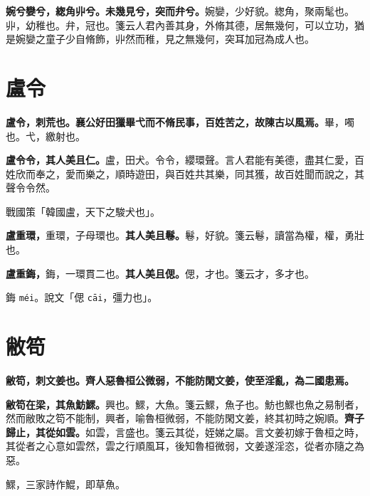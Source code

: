 \textbf{婉兮孌兮，緫角丱兮。未幾見兮，突而弁兮。}{\footnotesize 婉孌，少好貌。緫角，聚兩髦也。丱，幼稚也。弁，冠也。箋云人君內善其身，外脩其德，居無幾何，可以立功，猶是婉孌之童子少自脩飾，丱然而稚，見之無幾何，突耳加冠為成人也。}

\section{盧令}


\textbf{盧令，刺荒也。襄公好田獵畢弋而不脩民事，百姓苦之，故陳古以風焉。}{\footnotesize 畢，噣也。弋，繳射也。}

\textbf{盧令令，其人美且仁。}{\footnotesize 盧，田犬。令令，纓環聲。言人君能有美德，盡其仁愛，百姓欣而奉之，愛而樂之，順時遊田，與百姓共其樂，同其獲，故百姓聞而說之，其聲令令然。}

\begin{quoting}戰國策「韓國盧，天下之駿犬也」。\end{quoting}

\textbf{盧重環，}{\footnotesize 重環，子母環也。}\textbf{其人美且鬈。}{\footnotesize 鬈，好貌。箋云鬈，讀當為權，權，勇壯也。}

\textbf{盧重鋂，}{\footnotesize 鋂，一環貫二也。}\textbf{其人美且偲。}{\footnotesize 偲，才也。箋云才，多才也。}

\begin{quoting}鋂 \texttt{méi}。說文「偲 \texttt{cāi}，彊力也」。\end{quoting}

\section{敝笱}


\textbf{敝笱，刺文姜也。齊人惡魯桓公微弱，不能防閑文姜，使至淫亂，為二國患焉。}

\textbf{敝笱在梁，其魚魴鰥。}{\footnotesize 興也。鰥，大魚。箋云鰥，魚子也。魴也鰥也魚之易制者，然而敝敗之笱不能制，興者，喻魯桓微弱，不能防閑文姜，終其初時之婉順。}\textbf{齊子歸止，其從如雲。}{\footnotesize 如雲，言盛也。箋云其從，姪娣之屬。言文姜初嫁于魯桓之時，其從者之心意如雲然，雲之行順風耳，後知魯桓微弱，文姜遂淫恣，從者亦隨之為惡。}

\begin{quoting}鰥，三家詩作鯤，即草魚。\end{quoting}

